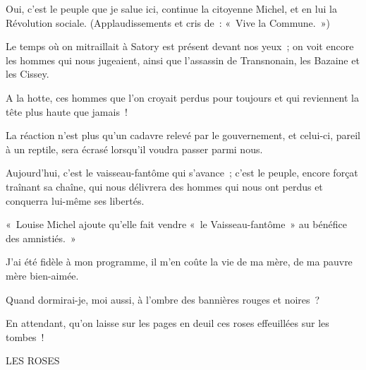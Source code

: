 \documentclass[french,twoside]{book} %
\newenvironment{quoteblock}%
  {\begin{quoting}}
  {\end{quoting}}
\newenvironment{quotebar}{%
    \def\FrameCommand{{\color{rubric!10!}\vrule width 0.5em} \hspace{0.9em}}%
    \def\OuterFrameSep{\itemsep} %
    \MakeFramed {\advance\hsize-\width \FrameRestore}
  }%
  {%
    \endMakeFramed
  }
\renewenvironment{quoteblock}%
  {%
    \savenotes
    \setstretch{0.9}
    \normalfont
    \begin{quotebar}
  }
  {%
    \end{quotebar}
    \spewnotes
  }
\begin{document}
\begin{quoteblock}
\begin{quoteblock}
 \noindent Oui, c’est le peuple que je salue ici, continue la citoyenne Michel, et en lui la Révolution sociale. (Applaudissements et cris de : « Vive la Commune. »)\par
 Le temps où on mitraillait à Satory est présent devant nos yeux ; on voit encore les hommes qui nous jugeaient, ainsi que l’assassin de Transnonain, les Bazaine et les Cissey.\par
 A la hotte, ces hommes que l’on croyait perdus pour toujours et qui reviennent la tête plus haute que jamais !\par
 La réaction n’est plus qu’un cadavre relevé par le gouvernement, et celui-ci, pareil à un reptile, sera écrasé lorsqu’il voudra passer parmi nous.\par
 Aujourd’hui, c’est le vaisseau-fantôme qui s’avance ; c’est le peuple, encore forçat traînant sa chaîne, qui nous délivrera des hommes qui nous ont perdus et conquerra lui-même ses libertés.
 \end{quoteblock}

 \noindent « Louise Michel ajoute qu’elle fait vendre « le Vaisseau-fantôme » au bénéfice des amnistiés. »
 \end{quoteblock}

\noindent J’ai été fidèle à mon programme, il m’en coûte la vie de ma mère, de ma pauvre mère bien-aimée.\par
Quand dormirai-je, moi aussi, à l’ombre des bannières rouges et noires ?\par
En attendant, qu’on laisse sur les pages en deuil ces roses effeuillées sur les tombes !\par

\begin{quoteblock}
LES ROSES\end{quoteblock}
\end{document}
